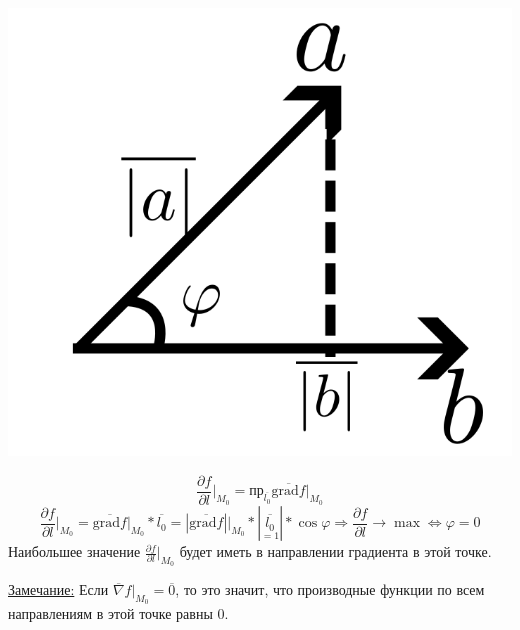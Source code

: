 \documentclass[12pt]{article}
\let\ORIincludegraphics\includegraphics
\renewcommand{\includegraphics}[2][]{\ORIincludegraphics[scale=0.65,#1]{#2}}
\begin{document}
    \begin{center}
        \includegraphics{7.10.2.png}
    \end{center}
    \[ \boxed{ \frac{\partial f}{\partial l} \Big|_{M_0} = \text{пр}_{\overline{l_0}}\overline{\text{grad}f}\Big|_{M_0} } \]
    \[ \frac{\partial f}{\partial l}\Big|_{M_0} = \overline{\text{grad}f}\Big|_{M_0} * \overline{l_0} = |\overline{\text{grad}f}|\Big|_{M_0} * |\underset{=1}{\overline{l_0}}| * \cos \varphi \Rightarrow \frac{\partial f}{\partial l} \to \max \Leftrightarrow \varphi = 0 \]
    Наибольшее значение $\frac{\partial f}{\partial l}\Big|_{M_0}$ будет иметь в направлении градиента в этой точке.\par\noindent
    \underline{Замечание:} Если $\overline{\nabla} f\Big|_{M_0} = \overline{0}$, то это значит, что производные функции по всем направлениям в этой точке равны $0$.
\end{document}
